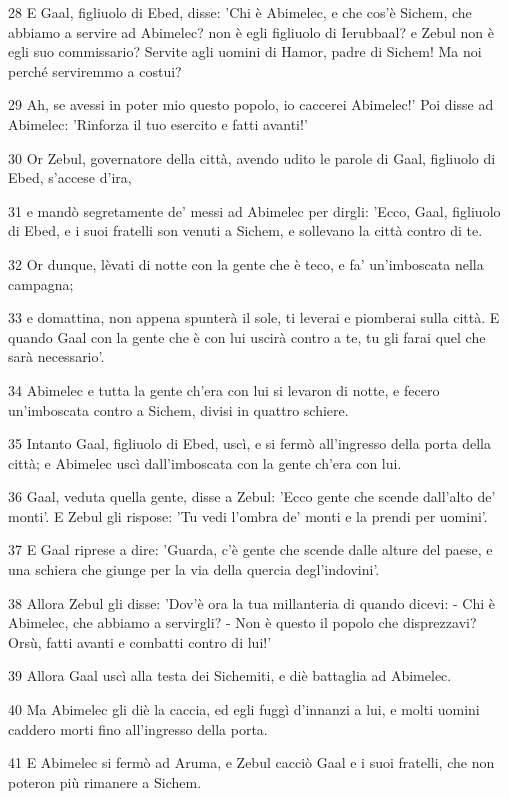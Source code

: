 \par 28 E Gaal, figliuolo di Ebed, disse: 'Chi è Abimelec, e che cos'è Sichem, che abbiamo a servire ad Abimelec? non è egli figliuolo di Ierubbaal? e Zebul non è egli suo commissario? Servite agli uomini di Hamor, padre di Sichem! Ma noi perché serviremmo a costui?
\par 29 Ah, se avessi in poter mio questo popolo, io caccerei Abimelec!' Poi disse ad Abimelec: 'Rinforza il tuo esercito e fatti avanti!'
\par 30 Or Zebul, governatore della città, avendo udito le parole di Gaal, figliuolo di Ebed, s'accese d'ira,
\par 31 e mandò segretamente de' messi ad Abimelec per dirgli: 'Ecco, Gaal, figliuolo di Ebed, e i suoi fratelli son venuti a Sichem, e sollevano la città contro di te.
\par 32 Or dunque, lèvati di notte con la gente che è teco, e fa' un'imboscata nella campagna;
\par 33 e domattina, non appena spunterà il sole, ti leverai e piomberai sulla città. E quando Gaal con la gente che è con lui uscirà contro a te, tu gli farai quel che sarà necessario'.
\par 34 Abimelec e tutta la gente ch'era con lui si levaron di notte, e fecero un'imboscata contro a Sichem, divisi in quattro schiere.
\par 35 Intanto Gaal, figliuolo di Ebed, uscì, e si fermò all'ingresso della porta della città; e Abimelec uscì dall'imboscata con la gente ch'era con lui.
\par 36 Gaal, veduta quella gente, disse a Zebul: 'Ecco gente che scende dall'alto de' monti'. E Zebul gli rispose: 'Tu vedi l'ombra de' monti e la prendi per uomini'.
\par 37 E Gaal riprese a dire: 'Guarda, c'è gente che scende dalle alture del paese, e una schiera che giunge per la via della quercia degl'indovini'.
\par 38 Allora Zebul gli disse: 'Dov'è ora la tua millanteria di quando dicevi: - Chi è Abimelec, che abbiamo a servirgli? - Non è questo il popolo che disprezzavi? Orsù, fatti avanti e combatti contro di lui!'
\par 39 Allora Gaal uscì alla testa dei Sichemiti, e diè battaglia ad Abimelec.
\par 40 Ma Abimelec gli diè la caccia, ed egli fuggì d'innanzi a lui, e molti uomini caddero morti fino all'ingresso della porta.
\par 41 E Abimelec si fermò ad Aruma, e Zebul cacciò Gaal e i suoi fratelli, che non poteron più rimanere a Sichem.
